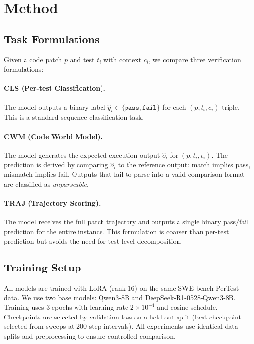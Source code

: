 \documentclass[11pt]{article}
\begin{document}
\section{Method}

\subsection{Task Formulations}

Given a code patch $p$ and test $t_i$ with context $c_i$, we compare three verification formulations:

\paragraph{CLS (Per-test Classification).} The model outputs a binary label $\hat{y}_i \in \{\texttt{pass}, \texttt{fail}\}$ for each $(p, t_i, c_i)$ triple. This is a standard sequence classification task.

\paragraph{CWM (Code World Model).} The model generates the expected execution output $\hat{o}_i$ for $(p, t_i, c_i)$. The prediction is derived by comparing $\hat{o}_i$ to the reference output: match implies pass, mismatch implies fail. Outputs that fail to parse into a valid comparison format are classified as \emph{unparseable}.

\paragraph{TRAJ (Trajectory Scoring).} The model receives the full patch trajectory and outputs a single binary pass/fail prediction for the entire instance. This formulation is coarser than per-test prediction but avoids the need for test-level decomposition.

\subsection{Training Setup}

All models are trained with LoRA (rank 16) on the same SWE-bench PerTest data. We use two base models: Qwen3-8B and DeepSeek-R1-0528-Qwen3-8B. Training uses 3 epochs with learning rate $2 \times 10^{-4}$ and cosine schedule. Checkpoints are selected by validation loss on a held-out split (best checkpoint selected from sweeps at 200-step intervals). All experiments use identical data splits and preprocessing to ensure controlled comparison.
\end{document}
